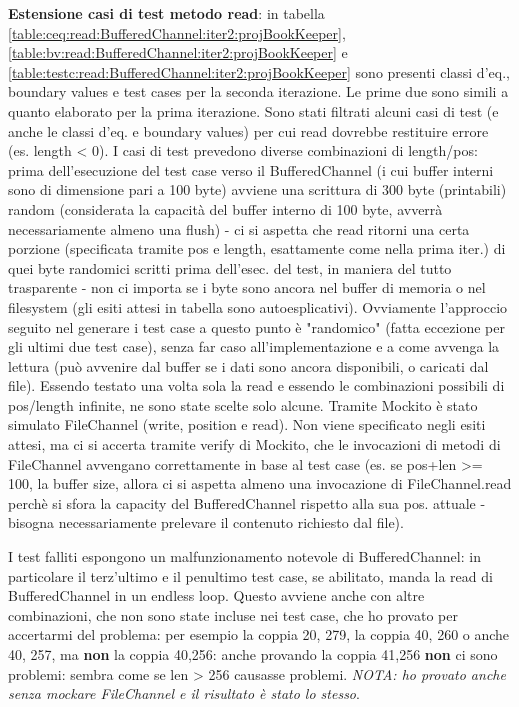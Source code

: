 \documentclass[10pt, a4paper]{article}
\newcommand{\gettablelabel}[5]{table:#1:#2:#3:iter#4:proj#5}
\def\bookkeeper{BookKeeper}
\begin{document}
	\textbf{Estensione casi di test metodo read}: in tabella 
	\ref{\gettablelabel{ceq}{read}{BufferedChannel}{2}{\bookkeeper}}, 
	\ref{\gettablelabel{bv}{read}{BufferedChannel}{2}{\bookkeeper}} e 
	\ref{\gettablelabel{testc}{read}{BufferedChannel}{2}{\bookkeeper}}
	sono presenti classi d'eq., boundary values e test cases per la seconda iterazione. Le prime due sono
	simili a quanto elaborato per la prima iterazione. Sono stati filtrati alcuni casi di test 
	(e anche le classi d'eq. e boundary values) per cui read
	dovrebbe restituire errore (es. length < 0). I casi di test prevedono diverse combinazioni di length/pos:
	prima dell'esecuzione del test case verso il BufferedChannel 
	(i cui buffer interni sono di dimensione pari a 100 byte) avviene una scrittura di 300 byte (printabili)
	random (considerata la capacità del buffer interno di 100 byte, avverrà necessariamente almeno una flush) - 
	ci si aspetta che read ritorni una certa porzione
	(specificata tramite pos e length, esattamente come nella prima iter.) 
	di quei byte randomici scritti prima dell'esec. del test, in maniera del tutto
	trasparente - non ci importa se i byte sono ancora nel buffer di memoria o nel filesystem (gli esiti
	attesi in tabella sono autoesplicativi). Ovviamente l'approccio seguito nel generare i test case a questo
	punto è "randomico" (fatta eccezione per gli ultimi due test case), 
	senza far caso all'implementazione e a come avvenga la lettura (può avvenire dal buffer
	se i dati sono ancora disponibili, o caricati dal file). Essendo testato una volta sola la read e essendo
	le combinazioni possibili di pos/length infinite, ne sono state scelte solo alcune.
	Tramite Mockito è stato simulato FileChannel (write, position e read). 
	Non viene specificato negli esiti attesi, ma ci si accerta tramite verify di Mockito,
	che le invocazioni di metodi di FileChannel avvengano correttamente in base al test case 
	(es. se pos+len >= 100, la buffer size, allora ci si aspetta almeno una invocazione di FileChannel.read perchè 
	si sfora la capacity del BufferedChannel rispetto alla sua pos. attuale - 
	bisogna necessariamente prelevare il contenuto richiesto dal file).
	
	I test falliti espongono un malfunzionamento notevole di BufferedChannel: 
	in particolare il terz'ultimo e il penultimo test case, se abilitato, 
	manda la read di BufferedChannel in un endless loop. Questo avviene anche con
	altre combinazioni, che non sono state incluse nei test case, che ho provato per accertarmi del problema:
	per esempio la coppia 20, 279, la coppia 40, 260 o anche 40, 257, 
	ma \textbf{non} la coppia 40,256: anche provando la coppia 41,256 \textbf{non} ci sono problemi: sembra come
	se len > 256 causasse problemi. \textit{NOTA: ho provato anche senza mockare FileChannel e il risultato
	è stato lo stesso}.
	
\end{document}

